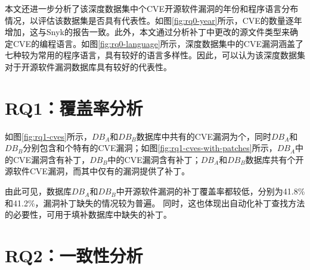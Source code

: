 本文还进一步分析了该深度数据集中个CVE开源软件漏洞的年份和程序语言分布情况，以评估该数据集是否具有代表性。如图\ref{fig:rq0-year}所示，CVE的数量逐年增加，这与Snyk的报告\cite{Snyk-report}一致。此外，本文通过分析补丁中更改的源文件类型来确定CVE的编程语言。如图\ref{fig:rq0-language}所示，深度数据集中的CVE漏洞涵盖了七种较为常用的程序语言，具有较好的语言多样性。因此，可以认为该深度数据集对于开源软件漏洞数据库具有较好的代表性。


\section{RQ1：覆盖率分析}\label{sec:coverage}

如图\ref{fig:rq1-cves}所示，$DB_A$和$DB_B$数据库中共有的CVE漏洞为个，同时$DB_A$和$DB_B$分别包含和个特有的CVE漏洞；如图\ref{fig:rq1-cves-with-patches}所示，$DB_A$中的CVE漏洞含有补丁，$DB_B$中的CVE漏洞含有补丁；$DB_A$和$DB_B$数据库共有个开源软件CVE漏洞，而其中仅有的漏洞提供了补丁。



由此可见，数据库$DB_A$和$DB_B$中开源软件漏洞的补丁覆盖率都较低，分别为41.8\%和41.2\%，漏洞补丁缺失的情况较为普遍。%
同时，这也体现出自动化补丁查找方法的必要性，可用于填补数据库中缺失的补丁。


\section{RQ2：一致性分析}\label{sec:consistency}

